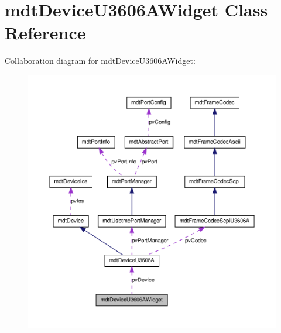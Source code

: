 \hypertarget{classmdt_device_u3606_a_widget}{
\section{mdtDeviceU3606AWidget Class Reference}
\label{classmdt_device_u3606_a_widget}
}


Collaboration diagram for mdtDeviceU3606AWidget:\nopagebreak
\begin{figure}[H]
\begin{center}
\leavevmode
\includegraphics[width=400pt]{classmdt_device_u3606_a_widget__coll__graph}
\end{center}
\end{figure}
